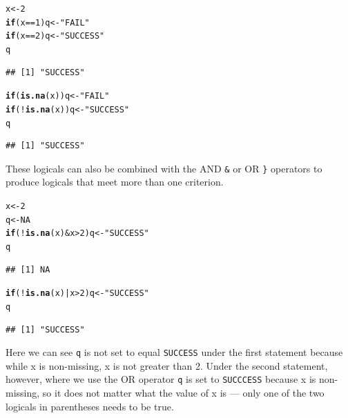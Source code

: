 \documentclass[12pt]{article}\usepackage[]{graphicx}\usepackage[]{color}
\makeatletter
\newcommand{\hlnum}[1]{\textcolor[rgb]{0.686,0.059,0.569}{#1}}%
\newcommand{\hlstr}[1]{\textcolor[rgb]{0.192,0.494,0.8}{#1}}%
\newcommand{\hlopt}[1]{\textcolor[rgb]{0,0,0}{#1}}%
\newcommand{\hlstd}[1]{\textcolor[rgb]{0.345,0.345,0.345}{#1}}%
\newcommand{\hlkwa}[1]{\textcolor[rgb]{0.161,0.373,0.58}{\textbf{#1}}}%
\newcommand{\hlkwb}[1]{\textcolor[rgb]{0.69,0.353,0.396}{#1}}%
\newcommand{\hlkwd}[1]{\textcolor[rgb]{0.737,0.353,0.396}{\textbf{#1}}}%
\newenvironment{kframe}{%
 \def\at@end@of@kframe{}%
 \ifinner\ifhmode%
  \def\at@end@of@kframe{\end{minipage}}%
  \begin{minipage}{\columnwidth}%
 \fi\fi%
 \def\FrameCommand##1{\hskip\@totalleftmargin \hskip-\fboxsep
 \colorbox{shadecolor}{##1}\hskip-\fboxsep
     \hskip-\linewidth \hskip-\@totalleftmargin \hskip\columnwidth}%
 \MakeFramed {\advance\hsize-\width
   \@totalleftmargin\z@ \linewidth\hsize
   \@setminipage}}%
 {\par\unskip\endMakeFramed%
 \at@end@of@kframe}
\newenvironment{knitrout}{}{} %
\makeatother
\begin{document}
\begin{knitrout}
\color{fgcolor}\begin{kframe}
\begin{alltt}
\hlstd{x} \hlkwb{<-} \hlnum{2}
\hlkwa{if} \hlstd{(x}\hlopt{==}\hlnum{1}\hlstd{) q} \hlkwb{<-} \hlstr{"FAIL"}
\hlkwa{if} \hlstd{(x}\hlopt{==}\hlnum{2}\hlstd{) q} \hlkwb{<-} \hlstr{"SUCCESS"}
\hlstd{q}
\end{alltt}
\begin{verbatim}
## [1] "SUCCESS"
\end{verbatim}
\begin{alltt}
\hlkwa{if} \hlstd{(}\hlkwd{is.na}\hlstd{(x)) q} \hlkwb{<-} \hlstr{"FAIL"}
\hlkwa{if} \hlstd{(}\hlopt{!}\hlkwd{is.na}\hlstd{(x)) q} \hlkwb{<-} \hlstr{"SUCCESS"}
\hlstd{q}
\end{alltt}
\begin{verbatim}
## [1] "SUCCESS"
\end{verbatim}
\end{kframe}
\end{knitrout}

These logicals can also be combined with the AND \texttt{\&} or OR \texttt{\}} operators to produce logicals that meet more than one criterion.

\begin{knitrout}
\color{fgcolor}\begin{kframe}
\begin{alltt}
\hlstd{x} \hlkwb{<-} \hlnum{2}
\hlstd{q} \hlkwb{<-} \hlnum{NA}
\hlkwa{if} \hlstd{(}\hlopt{!}\hlkwd{is.na}\hlstd{(x)} \hlopt{&} \hlstd{x}\hlopt{>}\hlnum{2}\hlstd{) q} \hlkwb{<-} \hlstr{"SUCCESS"}
\hlstd{q}
\end{alltt}
\begin{verbatim}
## [1] NA
\end{verbatim}
\begin{alltt}
\hlkwa{if} \hlstd{(}\hlopt{!}\hlkwd{is.na}\hlstd{(x)} \hlopt{|} \hlstd{x}\hlopt{>}\hlnum{2}\hlstd{) q} \hlkwb{<-} \hlstr{"SUCCESS"}
\hlstd{q}
\end{alltt}
\begin{verbatim}
## [1] "SUCCESS"
\end{verbatim}
\end{kframe}
\end{knitrout}
Here we can see \texttt{q} is not set to equal \texttt{SUCCESS} under the first statement because while x is non-missing, x is not greater than 2. Under the second statement, however, where we use the OR operator \texttt{q} is set to \texttt{SUCCCESS} because x is non-missing, so it does not matter what the value of x is --- only one of the two logicals in parentheses needs to be true.
\end{document}
